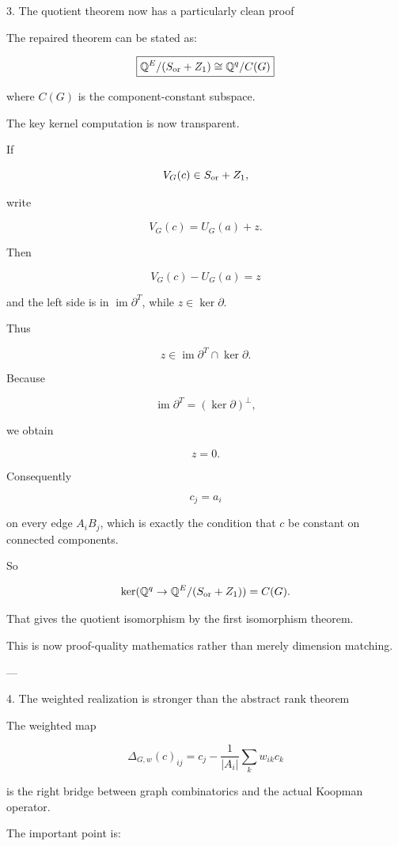3. The quotient theorem now has a particularly clean proof



The repaired theorem can be stated as:

\[
\boxed{  
\mathbb Q^E/(S_{\rm or}+Z_1)  
\cong  
\mathbb Q^q/C(G)  
}  
\]

where \(C(G)\) is the component-constant subspace.

The key kernel computation is now transparent.

If

\[
V_G(c)\in S_{\rm or}+Z_1,  
\]

write

\[
V_G(c)=U_G(a)+z.  
\]

Then

\[
V_G(c)-U_G(a)  
   =z  
\]

and the left side is in \(\operatorname{im}\partial^T\), while \(z\in\ker\partial\).

Thus

\[
z\in  
\operatorname{im}\partial^T\cap\ker\partial.  
\]

Because

\[
\operatorname{im}\partial^T  
   =(\ker\partial)^\perp,  
\]

we obtain

\[
z=0.  
\]

Consequently

\[
c_j=a_i  
\]

on every edge \(A_iB_j\), which is exactly the condition that \(c\) be constant on connected components.

So

\[
\ker(\mathbb Q^q\to  
\mathbb Q^E/(S_{\rm or}+Z_1))  
=C(G).  
\]

That gives the quotient isomorphism by the first isomorphism theorem.

This is now proof-quality mathematics rather than merely dimension matching.


---

4. The weighted realization is stronger than the abstract rank theorem



The weighted map

\[
\Delta_{G,w}(c)_{ij}  
=  
c_j-  
\frac{1}{|A_i|}  
\sum_k w_{ik}c_k  
\]

is the right bridge between graph combinatorics and the actual Koopman operator.

The important point is:

